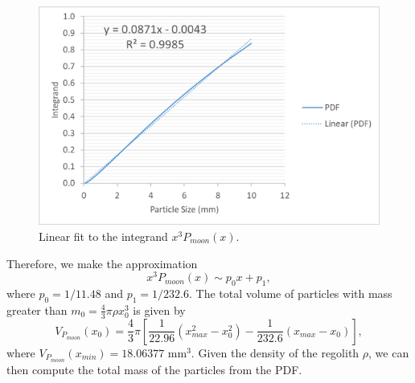 \documentclass{hitec}
\numberwithin{equation}{section}
\begin{document}
\begin{figure}[h!]
	\centering
	\includegraphics[scale=0.7]{Fit-to-x3PDF.png}
	\caption{Linear fit to the integrand $x^3 P_{moon}(x)$.}\label{fig:Fit-to-x3PDF}
\end{figure}

Therefore, we make the approximation
\begin{equation}
x^3 P_{moon}(x) \sim p_0 x + p_1,
\end{equation}
where $p_0 = 1/11.48$ and $p_1 = 1/232.6$. The total volume of particles with mass greater than $m_{0} = \frac{4}{3}\pi\rho x_{0}^3$ is given by
\begin{equation}\label{eq:VPmoon2}
V_{P_{moon}}(x_{0}) = \frac{4}{3}\pi \left[\frac{1}{22.96}\left(x_{max}^2 - x_{0}^2\right) - \frac{1}{232.6}\left(x_{max} - x_{0}\right)\right],
\end{equation}
where $V_{P_{moon}}(x_{min}) = 18.06377$ mm$^3$. Given the density of the regolith $\rho$, we can then compute the total mass of the particles from the PDF.

\end{document}
